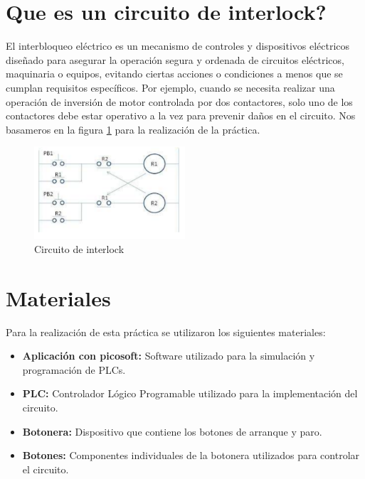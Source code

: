 \documentclass[12pt]{report}
\begin{document}
\section{Que es un circuito de interlock?}
El interbloqueo eléctrico es un mecanismo de controles y dispositivos eléctricos diseñado para asegurar la operación segura y ordenada de circuitos eléctricos, maquinaria o equipos, evitando ciertas acciones o condiciones a menos que se cumplan requisitos específicos. Por ejemplo, cuando se necesita realizar una operación de inversión de motor controlada por dos contactores, solo uno de los contactores debe estar operativo a la vez para prevenir daños en el circuito. Nos basameros en la figura \ref{fig:interlock} para la realización de la práctica.
\begin{figure}[H]
  \centering
  \includegraphics[width=0.5\textwidth]{screenshots/circuito_interlock.png}
  \caption{Circuito de interlock}
  \label{fig:interlock}
\end{figure}

\section{Materiales}
Para la realización de esta práctica se utilizaron los siguientes materiales:

\begin{itemize}
  \item \textbf{Aplicación con picosoft:} Software utilizado para la simulación y programación de PLCs.
  \item \textbf{PLC:} Controlador Lógico Programable utilizado para la implementación del circuito.
  \item \textbf{Botonera:} Dispositivo que contiene los botones de arranque y paro.
  \item \textbf{Botones:} Componentes individuales de la botonera utilizados para controlar el circuito.
\end{itemize}
\end{document}

